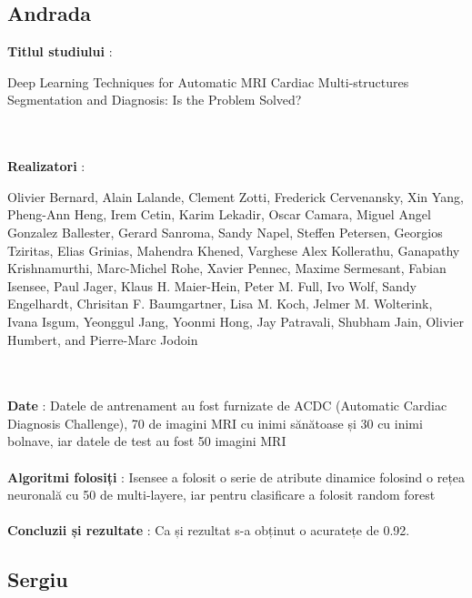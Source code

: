 \documentclass[a4papaer,12pt]{article}
\begin{document}
\subsection{Andrada}

\textbf{Titlul studiului} : \begin{Large}
Deep Learning Techniques for Automatic MRI
Cardiac Multi-structures Segmentation and
Diagnosis: Is the Problem Solved?
\end{Large}
\\\\
\indent \textbf{Realizatori} : \begin{large}Olivier Bernard, Alain Lalande, Clement Zotti, Frederick Cervenansky, Xin Yang, Pheng-Ann Heng, Irem Cetin,
Karim Lekadir, Oscar Camara, Miguel Angel Gonzalez Ballester, Gerard Sanroma, Sandy Napel,
Steffen Petersen, Georgios Tziritas, Elias Grinias, Mahendra Khened, Varghese Alex Kollerathu,
Ganapathy Krishnamurthi, Marc-Michel Rohe, Xavier Pennec, Maxime Sermesant, Fabian Isensee, Paul Jager,
Klaus H. Maier-Hein, Peter M. Full, Ivo Wolf, Sandy Engelhardt, Chrisitan F. Baumgartner, Lisa M. Koch,
Jelmer M. Wolterink, Ivana Isgum, Yeonggul Jang, Yoonmi Hong, Jay Patravali, Shubham Jain, Olivier Humbert,
and Pierre-Marc Jodoin
\end{large}
\\\\
\indent \textbf{Date} : Datele de antrenament au fost furnizate de ACDC (Automatic Cardiac Diagnosis Challenge), 70 de imagini MRI cu inimi sănătoase și 30 cu inimi bolnave, iar datele de test au fost 50 imagini MRI 
\\\\
\indent \textbf{Algoritmi folosiți} : Isensee a folosit o serie de atribute dinamice folosind o rețea neuronală cu 50 de multi-layere, iar pentru clasificare a folosit random forest 
\\\\
\indent \textbf{Concluzii și rezultate} : Ca și rezultat s-a obținut o acuratețe de 0.92.


\subsection{Sergiu}
\end{document}
